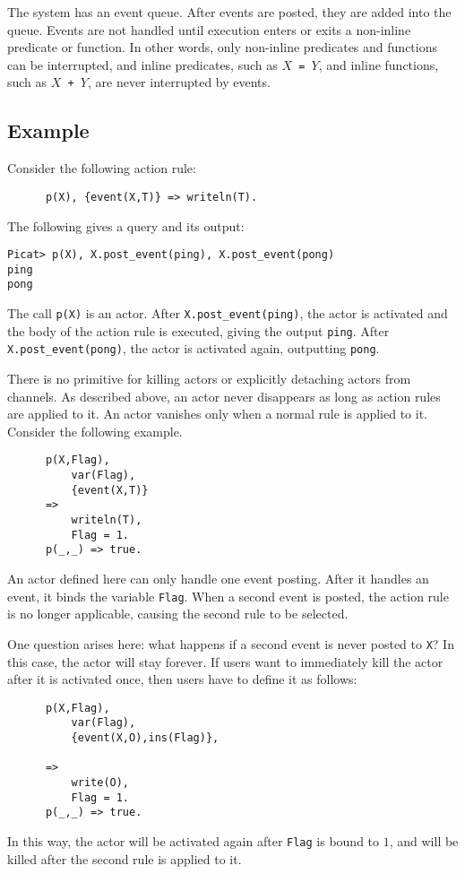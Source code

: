 The system has an event queue. After events are posted, they are added into the queue. Events are not handled until execution enters or exits a non-inline predicate or function. In other words, only non-inline predicates and functions can be interrupted, and inline predicates, such as \texttt{$X$ = $Y$}, and inline functions, such as \texttt{$X$ + $Y$}, are never interrupted by events.

\subsection*{Example}
Consider the following action rule:
\begin{verbatim}
      p(X), {event(X,T)} => writeln(T).
\end{verbatim}
The following gives a query and its output:
\begin{verbatim}
Picat> p(X), X.post_event(ping), X.post_event(pong)
ping
pong
\end{verbatim}
The call \texttt{p(X)} is an actor. After {\tt X.post\_event(ping)}, the actor is activated and the body of the action rule is executed, giving the output {\tt ping}. After \texttt{X.post\_event(pong)}, the actor is activated again, outputting {\tt pong}.


There is no primitive for killing actors or explicitly detaching actors from channels. As described above, an actor never disappears as long as action rules are applied to it. An actor vanishes only when a normal rule is applied to it. Consider the following example.
\begin{verbatim}
      p(X,Flag), 
          var(Flag), 
          {event(X,T)}
      => 
          writeln(T),
          Flag = 1.
      p(_,_) => true.
\end{verbatim}
An actor defined here can only handle one event posting. After it handles an event, it binds the variable \texttt{Flag}. When a second event is posted, the action rule is no longer applicable, causing the second rule to be selected.

One question arises here: what happens if a second event is never posted to \texttt{X}? In this case, the actor will stay forever. If users want to immediately kill the actor after it is activated once, then users have to define it as follows:
\begin{verbatim}
      p(X,Flag), 
          var(Flag), 
          {event(X,O),ins(Flag)},

      => 
          write(O),
          Flag = 1.
      p(_,_) => true.
\end{verbatim}
In this way, the actor will be activated again after \texttt{Flag} is bound to $1$, and will be killed after the second rule is applied to it.

